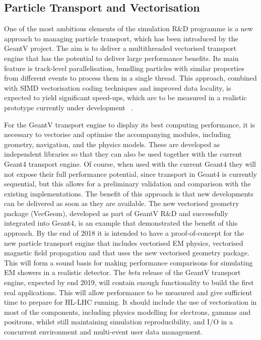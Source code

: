 \documentclass[12pt,a4paper]{article}
\begin{document}
{\hypertarget{particle-transport-and-vectorisation}{%
\subsection{Particle Transport and
Vectorisation}\label{particle-transport-and-vectorisation}}

One of the most ambitious elements of the simulation R\&D programme is a
new approach to managing particle transport, which has been introduced
by the GeantV project. The aim is to deliver a multithreaded vectorised
transport engine that has the potential to deliver large performance
benefits. Its main feature is track-level parallelisation, bundling
particles with similar properties from different events to process them
in a single thread. This approach, combined with SIMD vectorisation
coding techniques and improved data locality, is expected to yield
significant speed-ups, which are to be measured in a realistic prototype
currently under development ~\cite{1742-6596-608-1-012003}.

For the GeantV transport engine to display its best computing
performance, it is necessary to vectorise and optimise the accompanying
modules, including geometry, navigation, and the physics models. These
are developed as independent libraries so that they can also be used
together with the current Geant4 transport engine. Of course, when used
with the current Geant4 they will not expose their full performance
potential, since transport in Geant4 is currently sequential, but this
allows for a preliminary validation and comparison with the existing
implementations. The benefit of this approach is that new developments
can be delivered as soon as they are available. The new vectorised
geometry package (VecGeom), developed as part of GeantV R\&D and
successfully integrated into Geant4, is an example that demonstrated the
benefit of this approach. By the end of 2018 it is intended to have a
proof-of-concept for the new particle transport engine that includes
vectorised EM physics, vectorised magnetic field propagation and that
uses the new vectorised geometry package. This will form a sound basis
for making performance comparisons for simulating EM showers in a
realistic detector. The \emph{beta} release of the GeantV transport
engine, expected by end 2019, will contain enough functionality to build
the first real applications. This will allow performance to be measured
and give sufficient time to prepare for HL-LHC running. It should
include the use of vectorisation in most of the components, including
physics modelling for electrons, gammas and positrons, whilst still
maintaining simulation reproducibility, and I/O in a concurrent
environment and multi-event user data management.

}
\end{document}
